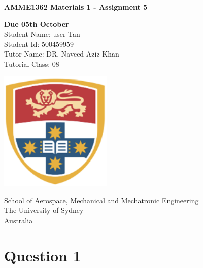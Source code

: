 \documentclass[11]{article}
\begin{document}
\begin{titlepage}
	\begin{center}
		\vspace*{1cm}

		\Huge
		\textbf{AMME1362 Materials 1 - Assignment 5}

		\vspace{0.5cm}
		\LARGE
		\textbf{Due 05th October} \\
		Student Name: user Tan\\
		Student Id:  500459959\\
		Tutor Name: DR. Naveed Aziz Khan\\
		Tutorial Class: 08

		\vspace{1.5cm}

		\large
		\vspace{1cm}

		\vfill

		\vspace{0.4cm}

		\includegraphics[width=0.4\textwidth]{photos/university-of-sydney.png}

		\Large
		School of Aerospace, Mechanical and Mechatronic Engineering\\
		The University of Sydney\\
		Australia\\

		\newpage
		\tableofcontents %
	\end{center}
\end{titlepage}

\newpage
\large
{}
\section{Question 1}


\cite{newton}



% 
% 
\newpage
\end{document}

